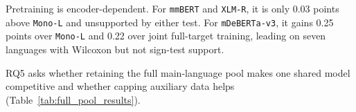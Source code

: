 \documentclass{article}
\begin{document}
Pretraining is encoder-dependent.
For \texttt{mmBERT} and \texttt{XLM-R}, it is only 0.03 points above \texttt{Mono-L} and unsupported by either test.
For \texttt{mDeBERTa-v3}, it gains 0.25 points over \texttt{Mono-L} and 0.22 over joint full-target training, leading on seven languages with Wilcoxon but not sign-test support.

RQ5 asks whether retaining the full main-language pool makes one shared model competitive and whether capping auxiliary data helps (Table~\ref{tab:full_pool_results}).

\begin{table}[H]
\centering
\caption{RQ5 full-pool shared results. Panel (a) reports macro F1 and panel (b) paired contrasts. \texttt{CapAux} abbreviates \texttt{Full-Multi12-CapAux}.}
\label{tab:full_pool_results}
\end{table}
\end{document}
